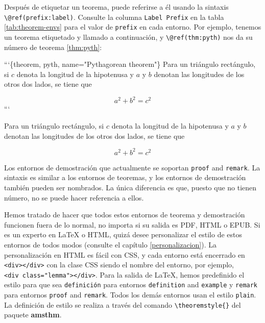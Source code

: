 \documentclass[12pt,]{krantz}
\makeatletter
\newenvironment{Shaded}{\begin{snugshade}}{\end{snugshade}}
\newcommand{\NormalTok}[1]{{#1}}
\newenvironment{kframe}{%
\medskip{}
\setlength{\fboxsep}{.8em}
 \def\at@end@of@kframe{}%
 \ifinner\ifhmode%
  \def\at@end@of@kframe{\end{minipage}}%
  \begin{minipage}{\columnwidth}%
 \fi\fi%
 \def\FrameCommand##1{\hskip\@totalleftmargin \hskip-\fboxsep
 \colorbox{shadecolor}{##1}\hskip-\fboxsep
     \hskip-\linewidth \hskip-\@totalleftmargin \hskip\columnwidth}%
 \MakeFramed {\advance\hsize-\width
   \@totalleftmargin\z@ \linewidth\hsize
   \@setminipage}}%
 {\par\unskip\endMakeFramed%
 \at@end@of@kframe}
\renewenvironment{Shaded}{\begin{kframe}}{\end{kframe}}
\theoremstyle{definition}
\theoremstyle{definition}
\theoremstyle{remark}
\let\BeginKnitrBlock\begin \let\EndKnitrBlock\end
\makeatother
\begin{document}
Después de etiquetar un teorema, puede referirse a él usando la sintaxis
\texttt{\textbackslash{}@ref(prefix:label)}. 
Consulte la columna \texttt{Label\ Prefix} en la tabla
\ref{tab:theorem-envs} para el valor de \texttt{prefix} en cada entorno.
Por ejemplo, tenemos un teorema etiquetado y llamado a continuación, y
\texttt{\textbackslash{}@ref(thm:pyth)} nos da su número de teorema
\ref{thm:pyth}:

\begin{Shaded}
\begin{Highlighting}[]
\NormalTok{```\{theorem, pyth, name="Pythagorean theorem"\}}
\NormalTok{Para un triángulo rectángulo, si $c$ denota la longitud de la hipotenusa}
\NormalTok{y $a$ y $b$ denotan las longitudes de los otros dos lados, se tiene que}

\NormalTok{$$a^2 + b^2 = c^2$$}
\NormalTok{```}
\end{Highlighting}
\end{Shaded}

\BeginKnitrBlock{theorem}[Teorema de Pitágoras]
\protect\hypertarget{thm:pyth}{}{\label{thm:pyth} }Para un triángulo rectángulo, si \(c\) denota la
longitud de la hipotenusa y \(a\) y \(b\) denotan las longitudes de los
otros dos lados, se tiene que

\[a^2 + b^2 = c^2\]
\EndKnitrBlock{theorem}

Los entornos de demostración que actualmente se soportan \texttt{proof}
and \texttt{remark}. La sintaxis es similar a los entornos de teoremas,
y los entornos de demostración también pueden ser nombrados. La única
diferencia es que, puesto que no tienen número, no se puede hacer
referencia a ellos.

Hemos tratado de hacer que todos estos entornos de teorema y
demostración funcionen fuera de lo normal, no importa si su salida es
PDF, HTML o EPUB. Si es un experto en LaTeX o HTML, quizá desee
personalizar el estilo de estos entornos de todos modos (consulte el
capítulo \ref{personalizacion}). La personalización en HTML es fácil con
CSS, y cada entorno está encerrado en
\texttt{\textless{}div\textgreater{}\textless{}/div\textgreater{}} con
la clase CSS siendo el nombre del entorno, por ejemplo,
\texttt{\textless{}div\ class="lemma"\textgreater{}\textless{}/div\textgreater{}}.
Para la salida de LaTeX, hemos predefinido el estilo para que sea
\texttt{definición} para entornos \texttt{definition} and
\texttt{example} y \texttt{remark} para entornos \texttt{proof} and
\texttt{remark}. Todos los demás entornos usan el estilo \texttt{plain}.
La definición de estilo se realiza a través del comando
\texttt{\textbackslash{}theoremstyle\{\}} del paquete \textbf{amsthm}.
\end{document}
